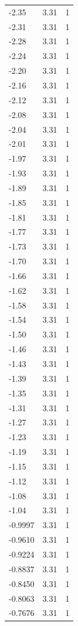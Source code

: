 \begin{longtable}{lrr}
  -2.35 & 3.31 & 1 \\
  -2.31 & 3.31 & 1 \\
  -2.28 & 3.31 & 1 \\
  -2.24 & 3.31 & 1 \\
  -2.20 & 3.31 & 1 \\
  -2.16 & 3.31 & 1 \\
  -2.12 & 3.31 & 1 \\
  -2.08 & 3.31 & 1 \\
  -2.04 & 3.31 & 1 \\
  -2.01 & 3.31 & 1 \\
  -1.97 & 3.31 & 1 \\
  -1.93 & 3.31 & 1 \\
  -1.89 & 3.31 & 1 \\
  -1.85 & 3.31 & 1 \\
  -1.81 & 3.31 & 1 \\
  -1.77 & 3.31 & 1 \\
  -1.73 & 3.31 & 1 \\
  -1.70 & 3.31 & 1 \\
  -1.66 & 3.31 & 1 \\
  -1.62 & 3.31 & 1 \\
  -1.58 & 3.31 & 1 \\
  -1.54 & 3.31 & 1 \\
  -1.50 & 3.31 & 1 \\
  -1.46 & 3.31 & 1 \\
  -1.43 & 3.31 & 1 \\
  -1.39 & 3.31 & 1 \\
  -1.35 & 3.31 & 1 \\
  -1.31 & 3.31 & 1 \\
  -1.27 & 3.31 & 1 \\
  -1.23 & 3.31 & 1 \\
  -1.19 & 3.31 & 1 \\
  -1.15 & 3.31 & 1 \\
  -1.12 & 3.31 & 1 \\
  -1.08 & 3.31 & 1 \\
  -1.04 & 3.31 & 1 \\
  -0.9997 & 3.31 & 1 \\
  -0.9610 & 3.31 & 1 \\
  -0.9224 & 3.31 & 1 \\
  -0.8837 & 3.31 & 1 \\
  -0.8450 & 3.31 & 1 \\
  -0.8063 & 3.31 & 1 \\
  -0.7676 & 3.31 & 1 \\

\end{longtable}
